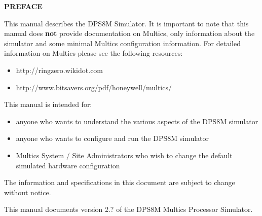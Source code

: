 \begin{center}
\Large\bfseries PREFACE
\end{center}

This manual describes the DPS8M Simulator. It is important to note that this manual 
does \textbf{not} provide documentation on Multics, only information about the simulator and some minimal Multics configuration information.
For detailed information on Multics please see the following resources:

\begin{itemize}
	\item http://ringzero.wikidot.com
	\item http://www.bitsavers.org/pdf/honeywell/multics/
\end{itemize} 

This manual is intended for:

\begin{itemize}
	\item anyone who wants to understand the various aspects of the DPS8M simulator
	\item anyone who wants to configure and run the DPS8M simulator
	\item Multics System / Site Administrators who wish to change the default simulated hardware configuration
\end{itemize} 

The information and specifications in this document are subject to change without notice.

This manual documents version 2.? of the DPS8M Multics Processor Simulator.

